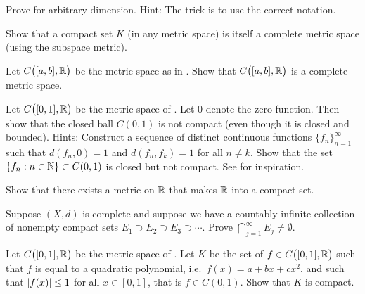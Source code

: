 \begin{exercise}
Prove  for arbitrary dimension.
Hint: The trick is to use the correct notation.
\end{exercise}

\begin{exercise} \label{exercise:subspacecompact}
Show that a compact set $K$ (in any metric space)
is itself a complete metric space (using the subspace metric).
\end{exercise}

\begin{exercise} \label{exercise:CabRcomplete}
Let $C\bigl([a,b],{\mathbb{R}}\bigr)$ be the metric space as in .  Show that
$C\bigl([a,b],{\mathbb{R}}\bigr)$ is a complete metric space.
\end{exercise}

\begin{exercise}[Challenging] \label{exercise:msclbounnotcompt}
Let $C\bigl([0,1],{\mathbb{R}}\bigr)$ be the metric space of .  Let $0$
denote the zero function.  Then show that the closed ball
$C(0,1)$ is not compact (even though it is closed and bounded).
Hints: Construct a sequence of distinct continuous functions
$\{ f_n \}_{n=1}^\infty$ such that
$d(f_n,0) = 1$ and $d(f_n,f_k) = 1$ for all $n \not= k$.  Show that
the set $\{ f_n : n \in {\mathbb{N}} \} \subset C(0,1)$ is closed but not compact.
See  for inspiration.
\end{exercise}

\begin{exercise}[Challenging]
Show that there exists a metric on ${\mathbb{R}}$ that makes ${\mathbb{R}}$ into a compact set.
\end{exercise}

\begin{exercise}
Suppose $(X,d)$ is complete and suppose we have a countably infinite
collection of nonempty compact sets $E_1 \supset E_2 \supset E_3 \supset
\cdots$.  Prove $\bigcap_{j=1}^\infty E_j \not= \emptyset$.
\end{exercise}

\begin{exercise}[Challenging]
Let $C\bigl([0,1],{\mathbb{R}}\bigr)$ be the metric space of .
Let $K$ be the set of $f \in C\bigl([0,1],{\mathbb{R}}\bigr)$ such that
$f$ is equal to a quadratic polynomial, i.e.\ $f(x) = a+bx+cx^2$, and such that
$\left\lvert {f(x)} \right\rvert \leq 1$ for all $x \in [0,1]$,
that is $f \in C(0,1)$.  Show that $K$ is compact.
\end{exercise}

